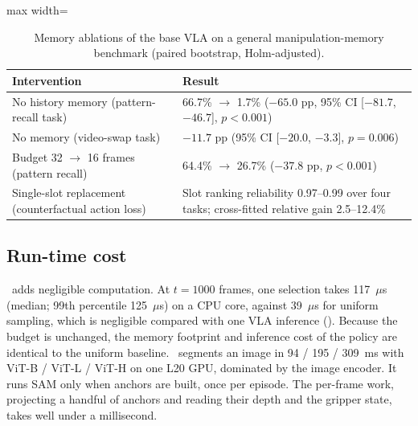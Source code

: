 \begin{table}[t]
\centering
\caption{Memory ablations of the base VLA on a general manipulation-memory benchmark (paired bootstrap, Holm-adjusted).}
\label{tab:general}
\footnotesize
\begin{adjustbox}{max width=\textwidth}\begin{tabular}{p{4.6cm}p{7.6cm}}
\toprule
Intervention & Result\\
\midrule
No history memory (pattern-recall task) & 66.7\% $\rightarrow$ 1.7\% ($-65.0$ pp, 95\% CI [$-81.7$, $-46.7$], $p<0.001$)\\
No memory (video-swap task) & $-11.7$ pp (95\% CI [$-20.0$, $-3.3$], $p=0.006$)\\
Budget 32 $\rightarrow$ 16 frames (pattern recall) & 64.4\% $\rightarrow$ 26.7\% ($-37.8$ pp, $p<0.001$)\\
Single-slot replacement (counterfactual action loss) & Slot ranking reliability 0.97--0.99 over four tasks; cross-fitted relative gain 2.5--12.4\%\\
\bottomrule
\end{tabular}\end{adjustbox}
\end{table}

\subsection{Run-time cost}
\label{sec:res_cost}
\pekm\ adds negligible computation. At $t=1000$ frames, one selection takes 117~$\mu$s (median; 99th percentile 125~$\mu$s) on a CPU core, against 39~$\mu$s for uniform sampling, which is negligible compared with one VLA inference (). Because the budget is unchanged, the memory footprint and inference cost of the policy are identical to the uniform baseline. \fdm\ segments an image in 94 / 195 / 309~ms with ViT-B / ViT-L / ViT-H on one L20 GPU, dominated by the image encoder. It runs SAM only when anchors are built, once per episode. The per-frame work, projecting a handful of anchors and reading their depth and the gripper state, takes well under a millisecond.
